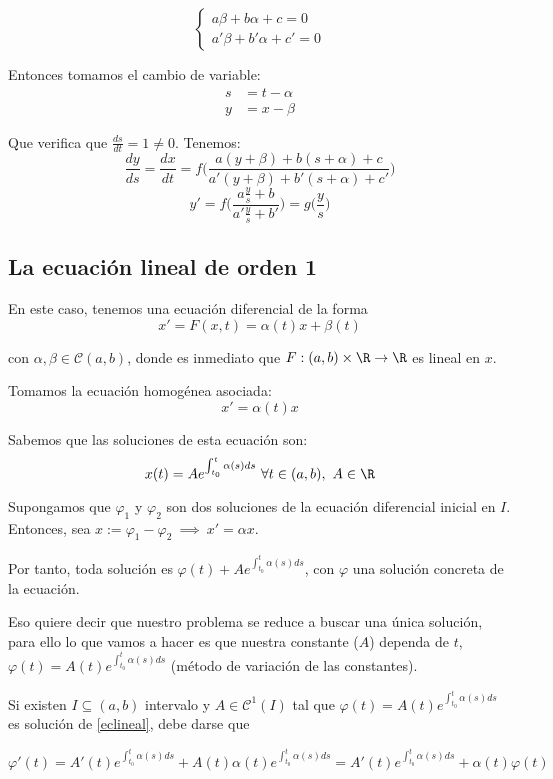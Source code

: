 \[
\begin{cases}
  a\beta + b\alpha + c = 0\\
  a'\beta + b'\alpha + c' = 0
\end{cases}
\]

Entonces tomamos el cambio de variable:
\begin{align*}
s &= t-\alpha \\
y &= x - \beta
\end{align*}

Que verifica que $\frac{ds}{dt} = 1 \ne 0$. Tenemos: 
\[
\frac{dy}{ds} = \frac{dx}{dt} = f\Big( \frac{a(y+\beta ) + b (s+\alpha ) + c}{a'(y+\beta ) + b'(s+ \alpha ) + c'} \Big)
\]
\[
y' = f \bigg( \frac{a \frac{y}{s} + b}{a'\frac{y}{s} + b'} \bigg) = g\Big( \frac{y}{s}\Big)
\]

\subsection{La ecuación lineal de orden 1}

En este caso, tenemos una ecuación diferencial de la forma
\[x' = F(x,t) = \alpha (t)x + \beta ( t) \tag{E} \label{eclineal} \]

con $\alpha , \beta \in \mathscr{C}(a,b)$, donde es inmediato que $F:(a,b)\times \R \to \R$ es lineal en $x$.

Tomamos la ecuación homogénea asociada:
\[
x' = \alpha (t) x
\]

Sabemos que las soluciones de esta ecuación son:
\[
x(t) = A e^{\int_{t_0}^{t} \alpha (s) ds}  \ \forall t \in (a,b), \ A \in \R
\]

Supongamos que $\varphi _1$ y $\varphi _2 $ son dos soluciones de la ecuación diferencial inicial en $I$. Entonces, sea $x := \varphi _1  - \varphi _2  \ \implies \ x' = \alpha x$.

Por tanto, toda solución es $\varphi (t) + A e^{\int_{t_0}^{t} \alpha (s) ds}$, con $\varphi$ una solución concreta de la ecuación.

Eso quiere decir que nuestro problema se reduce a buscar una única solución, para ello lo que vamos a hacer es que nuestra constante ($A$) dependa de $t$, $\varphi (t) = A(t) e^{\int_{t_0}^{t} \alpha (s) ds}$ (método de variación de las constantes).

Si existen $I \subseteq (a,b)$ intervalo y $A \in \mathscr{C}^1(I)$ tal que
$\varphi(t) = A(t) e^{\int_{t_0}^t \alpha(s)ds}$ es solución de \eqref{eclineal}, debe darse que

\[
 \varphi'(t) = A'(t)e^{\int_{t_0}^t \alpha(s) ds} + A(t)\alpha(t)e^{\int_{t_0}^t \alpha(s) ds} = A'(t)e^{\int_{t_0}^t \alpha(s) ds} + \alpha(t)\varphi(t)
 \]

